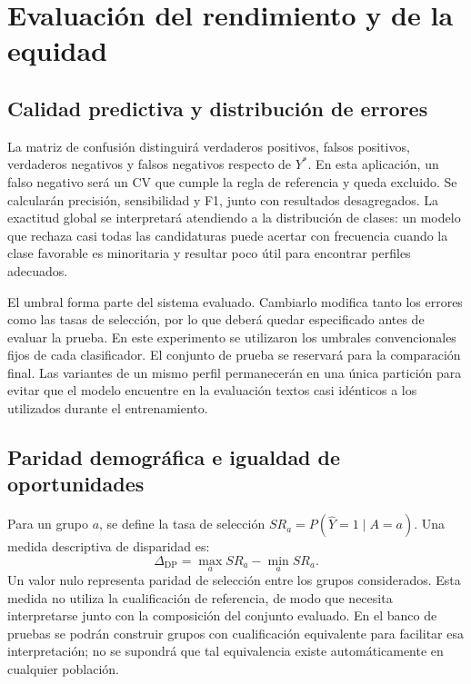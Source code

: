 \documentclass[11pt,a4paper,oneside]{report}
\begin{document}
\section{Evaluación del rendimiento y de la equidad}

\subsection{Calidad predictiva y distribución de errores}

La matriz de confusión distinguirá verdaderos positivos, falsos positivos, verdaderos negativos y falsos negativos respecto de $Y^{*}$. En esta aplicación, un falso negativo será un CV que cumple la regla de referencia y queda excluido. Se calcularán precisión, sensibilidad y F1, junto con resultados desagregados. La exactitud global se interpretará atendiendo a la distribución de clases: un modelo que rechaza casi todas las candidaturas puede acertar con frecuencia cuando la clase favorable es minoritaria y resultar poco útil para encontrar perfiles adecuados.

El umbral forma parte del sistema evaluado. Cambiarlo modifica tanto los errores como las tasas de selección, por lo que deberá quedar especificado antes de evaluar la prueba. En este experimento se utilizaron los umbrales convencionales fijos de cada clasificador. El conjunto de prueba se reservará para la comparación final. Las variantes de un mismo perfil permanecerán en una única partición para evitar que el modelo encuentre en la evaluación textos casi idénticos a los utilizados durante el entrenamiento.

\subsection{Paridad demográfica e igualdad de oportunidades}

Para un grupo $a$, se define la tasa de selección $SR_a=P(\widehat{Y}=1\mid A=a)$. Una medida descriptiva de disparidad es:
\begin{equation}
\Delta_{\mathrm{DP}}=\max_a SR_a-\min_a SR_a.
\end{equation}
Un valor nulo representa paridad de selección entre los grupos considerados. Esta medida no utiliza la cualificación de referencia, de modo que necesita interpretarse junto con la composición del conjunto evaluado. En el banco de pruebas se podrán construir grupos con cualificación equivalente para facilitar esa interpretación; no se supondrá que tal equivalencia existe automáticamente en cualquier población.
\end{document}
